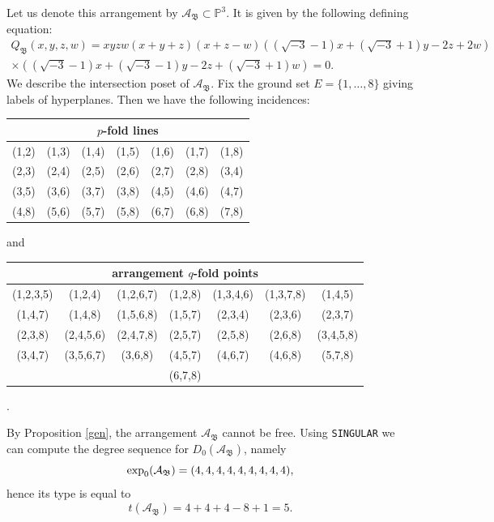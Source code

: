 \documentclass[11pt]{article}
\theoremstyle{plain}
\theoremstyle{definition}
\begin{document}
\noindent
{}
\vskip 5pt
\noindent
Let us denote this arrangement by $\mathcal{A}_{\mathfrak{B}} \subset \mathbb{P}^{3}$. It is given by the following defining equation:
\begin{multline*}
 Q_{\mathfrak{B}}(x,y,z,w) = xyzw(x+y+z)(x+z-w)((\sqrt{-3}-1)x+(\sqrt{-3}+1)y-2z+2w) \\
\times((\sqrt{-3}-1)x+(\sqrt{-3}-1)y-2z+(\sqrt{-3}+1)w)= 0.   
\end{multline*}
We describe the intersection poset of $\mathcal{A}_{\mathfrak{B}}$. Fix the ground set $E= \{1, \ldots , 8\}$ giving labels of hyperplanes. Then we have the following incidences:
\begin{center}
\begin{tabular}{ c c c c c c c }
\multicolumn{7}{c}{$p$-fold lines} \\\hline \hline
(1,2) & (1,3) & (1,4) & (1,5) & (1,6) & (1,7) & (1,8) \\
(2,3) & (2,4) & (2,5) & (2,6) & (2,7) & (2,8) & (3,4) \\
(3,5) & (3,6) & (3,7) & (3,8) & (4,5) & (4,6) & (4,7) \\
(4,8) & (5,6) & (5,7) & (5,8) & (6,7) & (6,8) & (7,8)

 
\end{tabular}
\end{center}
and 
\begin{center}
\begin{tabular}{ c c c c c c c }
\multicolumn{7}{c}{arrangement $q$-fold points} \\ \hline \hline 
 (1,2,3,5) & (1,2,4) & (1,2,6,7) & (1,2,8) & (1,3,4,6) & (1,3,7,8) & (1,4,5) \\
 (1,4,7) & (1,4,8) & (1,5,6,8) & (1,5,7) & (2,3,4) & (2,3,6) & (2,3,7) \\
 (2,3,8) & (2,4,5,6) &  (2,4,7,8) & (2,5,7) & (2,5,8) & (2,6,8) & (3,4,5,8) \\
 (3,4,7) & (3,5,6,7) & (3,6,8) & (4,5,7) & (4,6,7) & (4,6,8) & (5,7,8) \\
 & & & (6,7,8) & & &

\end{tabular}.
\end{center}
By Proposition \ref{gen}, the arrangement $\mathcal{A}_{\mathfrak{B}}$ cannot be free. Using \texttt{SINGULAR} we can compute the degree sequence for $D_{0}(\mathcal{A}_{\mathfrak{B}})$, namely
$${\rm exp}_{0}(\mathcal{A}_{\mathfrak{B}}) = (4,4,4,4,4,4,4,4,4),$$
hence its type is equal to
$$t(\mathcal{A}_{\mathfrak{B}})= 4+4+4-8+1=5.$$
\end{document}
